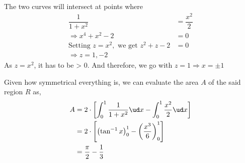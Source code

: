 \begin{solution}[\fullpage]
  The two curves will intersect at points where 
  \begin{align}
     \dfrac{1}{1+x^2} &= \dfrac{x^2}{2} \\
     \Rightarrow x^4+x^2-2 &= 0 \\
     \text{Setting } z = x^2, \text{ we get }
     z^2+z-2 &= 0 \\
     \Rightarrow z = 1, -2
  \end{align}
  As $z = x^2$, it has to be > 0. And therefore, we go with $z = 1 \Rightarrow x = \pm 1$
  
  Given how symmetrical everything is, we can evaluate the area $A$ of the said
  region $R$ as,
  \begin{align}
     A &= 2\cdot\left[ \int_0^1 \dfrac{1}{1+x^2}\ud x - \int_0^1\dfrac{x^2}{2}\ud x\right] \\
     &= 2\cdot\left[ \left( \tan^{-1} x\right)_0^1 - \left( \dfrac{x^3}{6}\right)_0^1\right] \\
     &= \dfrac{\pi}{2} - \dfrac{1}{3} 
  \end{align}
\end{solution}
